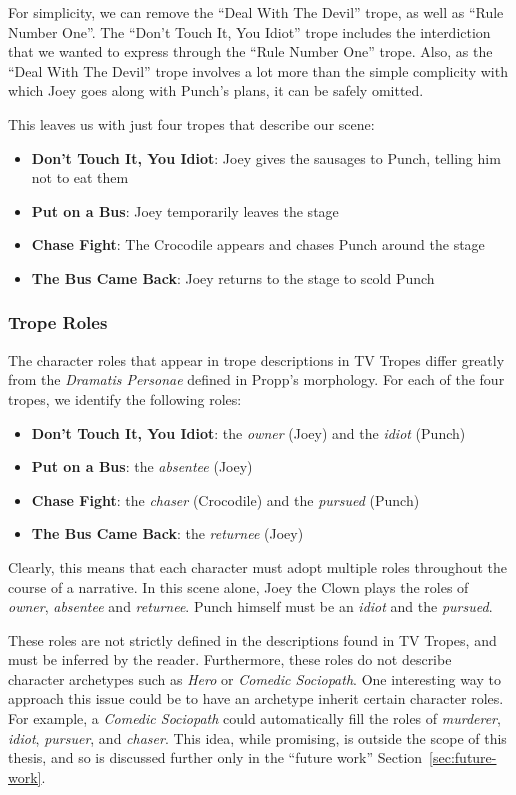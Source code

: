 \documentclass[11pt]{report}
\begin{document}
For simplicity, we can remove the ``Deal With The Devil'' trope, as well as
``Rule Number One''. The ``Don't Touch It, You Idiot'' trope includes the
interdiction that we wanted to express through the ``Rule Number One'' trope.
Also, as the ``Deal With The Devil'' trope involves a lot more than the simple
complicity with which Joey goes along with Punch's plans, it can be safely omitted.

This leaves us with just four tropes that describe our scene:

\begin{itemize}
\item\textbf{Don't Touch It, You Idiot}: Joey gives the sausages to Punch,
  telling him not to eat them
\item\textbf{Put on a Bus}: Joey temporarily leaves the stage
\item\textbf{Chase Fight}: The Crocodile appears and chases Punch around the stage
\item\textbf{The Bus Came Back}: Joey returns to the stage to scold Punch
\end{itemize}

\subsubsection{Trope Roles}
The character roles that appear in trope descriptions in TV Tropes differ
greatly from the \emph{Dramatis Personae} defined in Propp's morphology. For
each of the four tropes, we identify the following roles:

\begin{itemize}
\item \textbf{Don't Touch It, You Idiot}: the \emph{owner} (Joey) and the \emph{idiot} (Punch)
\item \textbf{Put on a Bus}: the \emph{absentee} (Joey)
\item \textbf{Chase Fight}: the \emph{chaser} (Crocodile) and the \emph{pursued} (Punch)
\item \textbf{The Bus Came Back}: the \emph{returnee} (Joey)
\end{itemize}

Clearly, this means that each character must adopt multiple roles throughout the
course of a narrative. In this scene alone, Joey the Clown plays the roles of
\emph{owner}, \emph{absentee} and \emph{returnee}. Punch himself must be an
\emph{idiot} and the \emph{pursued}.

These roles are not strictly defined in the descriptions found in TV Tropes, and
must be inferred by the reader. Furthermore, these roles do not describe
character archetypes such as \emph{Hero} or \emph{Comedic Sociopath}. One
interesting way to approach this issue could be to have an archetype inherit certain
character roles. For example, a \emph{Comedic Sociopath} could automatically
fill the roles of \emph{murderer}, \emph{idiot}, \emph{pursuer}, and
\emph{chaser}. This idea, while promising, is outside the scope of this thesis,
and so is discussed further only in the ``future work'' Section~\ref{sec:future-work}.
\end{document}
